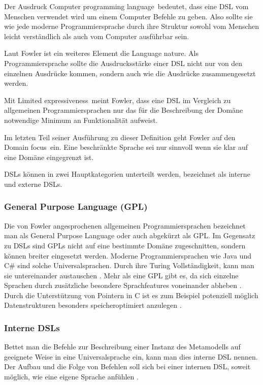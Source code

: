 \documentclass[12pt,oneside,a4paper,parskip]{scrbook}
\begin{document}
Der Ausdruck \glqq Computer programming language\grqq\ bedeutet, dass eine DSL vom Menschen verwendet wird um einem Computer Befehle zu geben. Also sollte sie wie jede moderne Programmiersprache durch ihre Struktur sowohl vom Menschen leicht verständlich als auch vom Computer ausführbar sein.

Laut Fowler ist ein weiteres Element die \glqq Language nature\grqq. Als Programmiersprache sollte die Ausdrucksstärke einer DSL nicht nur von den einzelnen Ausdrücke kommen, sondern auch wie die Ausdrücke zusammengesetzt werden.

Mit \glqq Limited expressiveness\grqq\ meint Fowler, dass eine DSL im Vergleich zu allgemeinen Programmiersprachen nur das für die Beschreibung der Domäne notwendige Minimum an Funktionalität aufweist. 

Im letzten Teil seiner Ausführung zu dieser Definition geht Fowler auf den \glqq Domain focus\grqq\ ein. Eine beschränkte Sprache sei nur sinnvoll wenn sie klar auf eine Domäne eingegrenzt ist.

DSLs können in zwei Hauptkategorien unterteilt werden, bezeichnet als interne und externe DSLs.

\subsubsection{General Purpose Language (GPL)}

Die von Fowler angesprochenen allgemeinen Programmiersprachen bezeichnet man als General Purpose Language oder auch abgekürzt als GPL. Im Gegensatz zu DSLs sind GPLs nicht auf eine bestimmte Domäne zugeschnitten, sondern können breiter eingesetzt werden. Moderne Programmiersprachen wie Java und C\# sind solche Universalsprachen. Durch ihre Turing Vollständigkeit, kann man sie untereinander austauschen \cite[S. 111]{hromkovic2014}. Mehr als eine GPL gibt es, da sich einzelne Sprachen durch zusätzliche besondere Sprachfeatures voneinander abheben \cite[S. 27]{voelter2013}. Durch die Unterstützung von Pointern in C ist es zum Beispiel potenziell möglich Datenstrukturen besonders speicheroptimiert anzulegen \cite[S. 93ff.]{kernighan1988}.

\subsubsection{Interne DSLs}

Bettet man die Befehle zur Beschreibung einer Instanz des Metamodells auf geeignete Weise in eine Universalsprache ein, kann man dies interne DSL nennen. Der Aufbau und die Folge von Befehlen soll sich bei einer internen DSL, soweit möglich, wie eine eigene Sprache anfühlen \cite[S 28]{fowler2010}.
\end{document}
